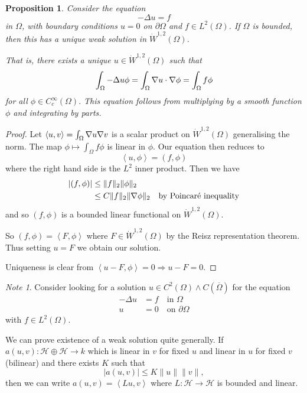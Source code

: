 \documentclass[10pt, oneside, reqno]{amsart}
\theoremstyle{plain}%
\newtheorem{prop}[thm]{Proposition}
\numberwithin{equation}{section}
\theoremstyle{definition}
\theoremstyle{remark}
\newtheorem*{note}{Note}
\newcommand{\iprod}[1]{\left\langle #1 \right\rangle}
\begin{document}
\begin{prop}
    Consider the equation 
    \begin{equation}
    -\Delta u = f
    \end{equation} in $\Omega$, with boundary conditions $u = 0$ on $\partial \Omega$ and $f \in L^2(\Omega)$.  If $\Omega$ is bounded, then this has a unique weak solution in $\dot W^{1, 2}(\Omega)$.
    
    That is, there exists a unique $u \in \dot W^{1, 2}(\Omega)$ such that \[
        \int_\Omega - \Delta u \phi = \int_\Omega \nabla u \cdot \nabla \phi = \int_\Omega f \phi
    \]  for all $\phi \in C^\infty_c(\Omega).$  This equation follows from multiplying by a smooth function $\phi$ and integrating by parts. 
\end{prop}

\begin{proof}
    Let $\iprod{u, v} = \int_\Omega \grad u \grad v$ is a scalar product on $\dot W^{1, 2}(\Omega)$ generalising the norm.  The map $\phi \mapsto \int_\Omega f \phi$ is linear in $\phi$.  Our equation then reduces to \[
        \iprod{u, \phi} = \left( f, \phi \right)
    \] where the right hand side is the $L^2$ inner product.  Then we have \begin{align*}
        \left| (f, \phi) \right| &\leq \| f \|_2 \| \phi \|_2 \\
                    &\leq C \| f \|_2 \| \nabla \phi \|_2 \quad \text{by Poincar\'e\ inequality}  
    \end{align*} and so $(f, \phi)$ is a bounded linear functional on $\dot W^{1, 2}(\Omega)$.  
    
    So $(f, \phi) = \iprod{F, \phi}$ where $F \in \dot W^{1, 2}(\Omega)$ by the Reisz representation theorem.  Thus setting $u = F$ we obtain our solution.  
    
    Uniqueness is clear from $\iprod{u - F, \phi} = 0 \Rightarrow u - F = 0$.
\end{proof}

\begin{note}
    Consider looking for a solution $u \in C^2(\Omega) \wedge C(\overline\Omega)$ for the equation \begin{align*}
        -\Delta u &= f \quad \text{in $\Omega$}\\
            u &= 0 \quad \text{on $\partial \Omega$}
    \end{align*} with $f \in L^2(\Omega)$.
\end{note}

    We can prove existence of a weak solution quite generally. If $a(u, v): \mathcal H \oplus \mathcal H \rightarrow k$ which is linear in $v$ for fixed $u$ and linear in $u$ for fixed $v$ (bilinear) and there exists $K$ such that \[
        |a(u, v)| \leq K \| u \| \| v \|,
    \] then we can write $a(u, v) = \iprod{Lu, v}$ where $L : \mathcal H \rightarrow \mathcal H$ is bounded and linear.  
\end{document}
